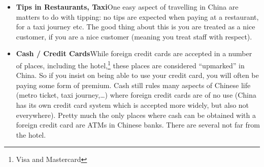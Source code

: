 \documentclass[11pt]{report}
\begin{document}
\begin{itemize}

\item \textbf{Tips in Restaurants, Taxi}\hspace{3mm}One easy
aspect of travelling in China are matters to do with tipping:
no tips are expected when paying at a restaurant, for a taxi 
journey etc. The good thing about this is you are treated as a 
nice customer, if you are a nice customer (meaning you treat 
staff with respect).

\item \textbf{Cash / Credit Cards}\hspace{3mm}While foreign
credit cards are accepted in a number of places, including
the hotel,\footnote{Visa and Mastercard} these places are 
considered ``upmarked'' in China. So if you insist on being able
to use your credit card, you will often be paying some form of 
premium. Cash still rules many aspects of Chinese life
(metro ticket, taxi journey,\ldots{}) where foreign credit cards 
are of no use (China has its own credit card system which is
accepted more widely, but also not everywhere). Pretty much the 
only places where cash can be obtained with a foreign credit 
card are ATMs in Chinese banks. There are several not far
from the hotel.
\end{itemize}
\end{document}
